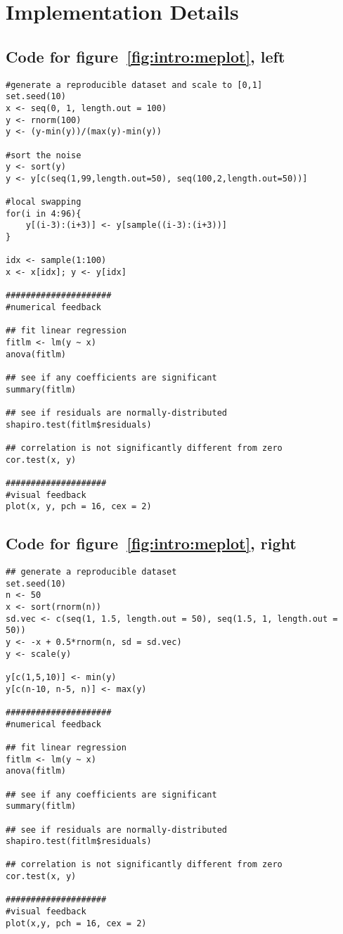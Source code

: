 \chapter{Implementation Details\label{ch:implementation}}

\lstset{basicstyle=\ttfamily\footnotesize,xleftmargin=0cm,breaklines=true,language=R}

\section{Code for figure~\ref{fig:intro:meplot}, left}
\label{sec:appendicies:me1plot}
{
\begin{lstlisting}
#generate a reproducible dataset and scale to [0,1]
set.seed(10)
x <- seq(0, 1, length.out = 100)
y <- rnorm(100)
y <- (y-min(y))/(max(y)-min(y))

#sort the noise
y <- sort(y)
y <- y[c(seq(1,99,length.out=50), seq(100,2,length.out=50))]

#local swapping
for(i in 4:96){
	y[(i-3):(i+3)] <- y[sample((i-3):(i+3))]
}

idx <- sample(1:100)
x <- x[idx]; y <- y[idx]

#####################
#numerical feedback

## fit linear regression
fitlm <- lm(y ~ x)
anova(fitlm)

## see if any coefficients are significant
summary(fitlm)

## see if residuals are normally-distributed
shapiro.test(fitlm$residuals)

## correlation is not significantly different from zero
cor.test(x, y)

####################
#visual feedback
plot(x, y, pch = 16, cex = 2)
\end{lstlisting}
}


\section{Code for figure~\ref{fig:intro:meplot}, right}
\label{sec:appendicies:me2plot}
{
\begin{lstlisting}
## generate a reproducible dataset
set.seed(10)
n <- 50
x <- sort(rnorm(n))
sd.vec <- c(seq(1, 1.5, length.out = 50), seq(1.5, 1, length.out = 50))
y <- -x + 0.5*rnorm(n, sd = sd.vec)
y <- scale(y)

y[c(1,5,10)] <- min(y)
y[c(n-10, n-5, n)] <- max(y)

#####################
#numerical feedback

## fit linear regression
fitlm <- lm(y ~ x)
anova(fitlm)

## see if any coefficients are significant
summary(fitlm)

## see if residuals are normally-distributed
shapiro.test(fitlm$residuals) 

## correlation is not significantly different from zero
cor.test(x, y)

####################
#visual feedback
plot(x,y, pch = 16, cex = 2)
\end{lstlisting}
}


